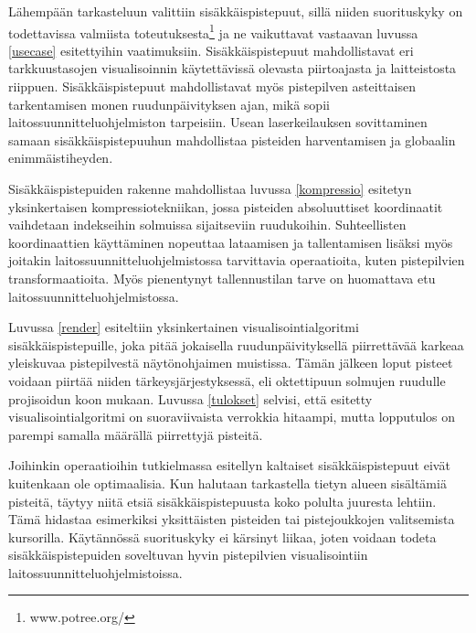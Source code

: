 Lähempään tarkasteluun valittiin sisäkkäispistepuut, sillä niiden suorituskyky on todettavissa valmiista toteutuksesta\footnote{www.potree.org/} ja ne vaikuttavat vastaavan luvussa \ref{usecase} esitettyihin vaatimuksiin. Sisäkkäispistepuut mahdollistavat eri tarkkuustasojen visualisoinnin käytettävissä olevasta piirtoajasta ja laitteistosta riippuen. Sisäkkäispistepuut mahdollistavat myös pistepilven asteittaisen tarkentamisen monen ruudunpäivityksen ajan, mikä sopii laitossuunnitteluohjelmiston tarpeisiin. Usean laserkeilauksen sovittaminen samaan sisäkkäispistepuuhun mahdollistaa pisteiden harventamisen ja globaalin enimmäistiheyden. 

Sisäkkäispistepuiden rakenne mahdollistaa luvussa \ref{kompressio} esitetyn yksinkertaisen kompressiotekniikan, jossa pisteiden absoluuttiset koordinaatit vaihdetaan indekseihin solmuissa sijaitseviin ruudukoihin. Suhteellisten koordinaattien käyttäminen nopeuttaa lataamisen ja tallentamisen lisäksi myös joitakin laitossuunnitteluohjelmistossa tarvittavia operaatioita, kuten pistepilvien transformaatioita. Myös pienentynyt tallennustilan tarve on huomattava etu laitossuunnitteluohjelmistossa.
 
Luvussa \ref{render} esiteltiin yksinkertainen visualisointialgoritmi sisäkkäispistepuille, joka pitää jokaisella ruudunpäivityksellä piirrettävää karkeaa yleiskuvaa pistepilvestä näytönohjaimen muistissa. Tämän jälkeen loput pisteet voidaan piirtää niiden tärkeysjärjestyksessä, eli oktettipuun solmujen ruudulle projisoidun koon mukaan. Luvussa \ref{tulokset} selvisi, että esitetty visualisointialgoritmi on suoraviivaista verrokkia hitaampi, mutta lopputulos on parempi samalla määrällä piirrettyjä pisteitä.    

Joihinkin operaatioihin tutkielmassa esitellyn kaltaiset sisäkkäispistepuut eivät kuitenkaan ole optimaalisia. Kun halutaan tarkastella tietyn alueen sisältämiä pisteitä, täytyy niitä etsiä sisäkkäispistepuusta koko polulta juuresta lehtiin. Tämä hidastaa esimerkiksi yksittäisten pisteiden tai pistejoukkojen valitsemista kursorilla. Käytännössä suorituskyky ei kärsinyt liikaa, joten voidaan todeta sisäkkäispistepuiden soveltuvan hyvin pistepilvien visualisointiin laitossuunnitteluohjelmistoissa.
